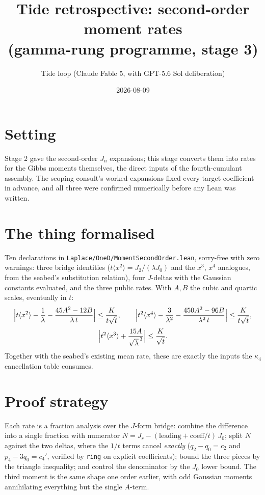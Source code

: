 \documentclass[11pt]{article}
\title{Tide retrospective: second-order moment rates\\
(gamma-rung programme, stage 3)}
\author{Tide loop (Claude Fable 5, with GPT-5.6 Sol deliberation)}
\date{2026-08-09}
\begin{document}
\maketitle

\section{Setting}

Stage 2 gave the second-order $J_n$ expansions; this stage converts them
into rates for the Gibbs moments themselves, the direct inputs of the
fourth-cumulant assembly. The scoping consult's worked expansions fixed
every target coefficient in advance, and all three were confirmed
numerically before any Lean was written.

\section{The thing formalised}

Ten declarations in \texttt{Laplace/OneD/MomentSecondOrder.lean},
sorry-free with zero warnings: three bridge identities
($t\langle x^2\rangle = J_2/(\lambda J_0)$ and the $x^3$, $x^4$
analogues, from the seabed's substitution relation), four $J$-deltas
with the Gaussian constants evaluated, and the three public rates. With
$A, B$ the cubic and quartic scales, eventually in $t$:
\[
\Bigl| t\langle x^2\rangle - \frac{1}{\lambda}
- \frac{45A^2 - 12B}{\lambda\,t} \Bigr| \leq \frac{K}{t\sqrt t},
\qquad
\Bigl| t^2\langle x^4\rangle - \frac{3}{\lambda^2}
- \frac{450A^2 - 96B}{\lambda^2\,t} \Bigr| \leq \frac{K}{t\sqrt t},
\]
\[
\Bigl| t^2\langle x^3\rangle + \frac{15A}{\sqrt\lambda^{\,3}} \Bigr|
\leq \frac{K}{\sqrt t}.
\]
Together with the seabed's existing mean rate, these are exactly the
inputs the $\kappa_4$ cancellation table consumes.

\section{Proof strategy}

Each rate is a fraction analysis over the $J$-form bridge: combine the
difference into a single fraction with numerator
$N = J_r - (\text{leading} + \text{coeff}/t)\,J_0$; split $N$ against
the two deltas, where the $1/t$ terms cancel \emph{exactly}
($q_2 - q_0 = c_2$ and $p_4 - 3q_0 = c_4'$, verified by \texttt{ring} on
explicit coefficients); bound the three pieces by the triangle
inequality; and control the denominator by the $J_0$ lower bound. The
third moment is the same shape one order earlier, with odd Gaussian
moments annihilating everything but the single $A$-term.
\end{document}
